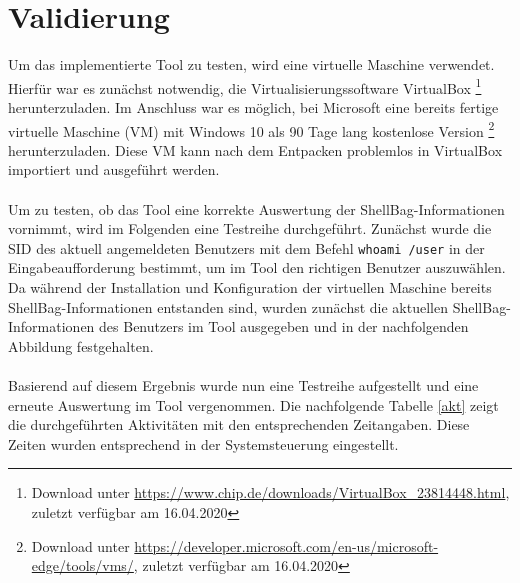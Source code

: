 \section{Validierung}
Um das implementierte Tool zu testen, wird eine virtuelle Maschine verwendet. Hierfür war es zunächst notwendig, die Virtualisierungssoftware VirtualBox \footnote{Download unter \url{https://www.chip.de/downloads/VirtualBox_23814448.html}, zuletzt verfügbar am 16.04.2020}  herunterzuladen. Im Anschluss war es möglich, bei Microsoft eine bereits fertige virtuelle Maschine (VM) mit Windows 10 als 90 Tage lang kostenlose Version \footnote{Download unter \url{https://developer.microsoft.com/en-us/microsoft-edge/tools/vms/}, zuletzt verfügbar am 16.04.2020}  herunterzuladen. Diese VM kann nach dem Entpacken problemlos in VirtualBox importiert und ausgeführt werden. \\
\\
Um zu testen, ob das Tool eine korrekte Auswertung der ShellBag-Informationen vornimmt, wird im Folgenden eine Testreihe durchgeführt. Zunächst wurde die SID des aktuell angemeldeten Benutzers mit dem Befehl \glqq \texttt{whoami /user}\grqq{} in der Eingabeaufforderung bestimmt, um im Tool den richtigen Benutzer auszuwählen. Da während der Installation und Konfiguration der virtuellen Maschine bereits ShellBag-Informationen entstanden sind, wurden zunächst die aktuellen ShellBag-Informationen des Benutzers im Tool ausgegeben und in der nachfolgenden Abbildung festgehalten. \\
\\
Basierend auf diesem Ergebnis wurde nun eine Testreihe aufgestellt und eine erneute Auswertung im Tool vergenommen. Die nachfolgende Tabelle \ref{akt} zeigt die durchgeführten Aktivitäten mit den entsprechenden Zeitangaben. Diese Zeiten wurden entsprechend in der Systemsteuerung eingestellt.

